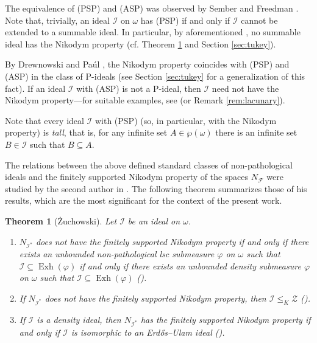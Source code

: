 \documentclass[a4paper,11pt,fleqn]{amsart}
\newtheorem{theorem}{Theorem}[section]
\theoremstyle{definition}
\theoremstyle{remark}
\numberwithin{equation}{section}
\newcommand{\N}{\mathbb{N}}
\newcommand{\fF}{\mathcal{F}}
\newcommand{\iI}{\mathcal{I}}
\newcommand{\lL}{\mathcal{L}}
\newcommand{\zZ}{\mathcal{Z}}
\DeclareMathOperator{\exh}{Exh}
\newcommand{\sub}{\subseteq}
\newcommand{\wo}{{\wp(\omega)}}%
\newcommand{\erdos}{{Erd\H{o}s}}
\begin{document}
The equivalence of (PSP) and (ASP) was observed by Sember and Freedman \cite[Proposition 1]{SF81}. Note that, trivially, an ideal $\iI$ on $\omega$ has (PSP) if and only if $\iI$ cannot be extended to a summable ideal. In particular, by aforementioned \cite[Corollary 2.3]{DFP96}, no summable ideal has the Nikodym property (cf. Theorem \ref{thm:zuch} and Section \ref{sec:tukey}).

By Drewnowski and Pa\'ul \cite[Theorem 3.5]{DP00}, the Nikodym property coincides with (PSP) and (ASP) in the class of P-ideals (see Section \ref{sec:tukey} for a generalization of this fact). If an ideal $\iI$ with (ASP) is not a P-ideal, then $\iI$ need not have the Nikodym property---for suitable examples, see \cite[Section 4]{DP00} (or Remark \ref{rem:lacunary}).%

Note that every ideal $\iI$ with (PSP) (so, in particular, with the Nikodym property) is \textit{tall}, that is, for any infinite set $A\in\wo$ there is an infinite set $B\in\iI$ such that $B\sub A$.

\medskip

The relations between the above defined standard classes of non-pathological ideals and the finitely supported Nikodym property of the spaces $N_\fF$ were studied by the second author in \cite{Zuc25}. The following theorem summarizes those of his results, which are the most significant for the context of the present work.%

\begin{theorem}[\.{Z}uchowski]\label{thm:zuch}%
Let $\iI$ be an ideal on $\omega$.
\begin{enumerate}
    \item $N_{\iI^*}$ does not have the finitely supported Nikodym property if and only if there exists an unbounded non-pathological lsc submeasure $\varphi$ on $\omega$ such that $\iI\sub\exh(\varphi)$ if and only if there exists an unbounded density submeasure $\varphi$ on $\omega$ such that $\iI\sub\exh(\varphi)$ (\cite[Theorem 4.3]{Zuc25}).
    \item If $N_{\iI^*}$ does not have the finitely supported Nikodym property, then $\iI\le_K\zZ$ (\cite[Corollary 5.4]{Zuc25}).
    \item If $\iI$ is a density ideal, then $N_{\iI^*}$ has the finitely supported Nikodym property if and only if $\iI$ is isomorphic to an \erdos--Ulam ideal (\cite[Theorem 5.5]{Zuc25}). %
\end{enumerate}
\end{theorem}
\end{document}
